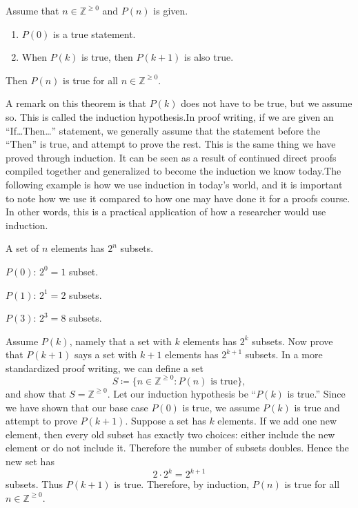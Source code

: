\begin{theorem}{Assume that $n \in \mathbb{Z}^{\geq 0}$ and $P(n)$ is given.
    \begin{enumerate}
        \item $P(0)$ is a true statement.
        \item When $P(k)$ is true, then $P(k+1)$ is also true.
    \end{enumerate}
    Then $P(n)$ is true for all $n \in \mathbb{Z}^{\geq 0}$.
}
A remark on this theorem is that $P(k)$ does not have to be true, but we assume so.
This is called the induction hypothesis.In proof writing, if we are given an ``If\ldots Then\ldots'' statement, we generally assume that the statement before the ``Then'' is true, and attempt to prove the rest.
This is the same thing we have proved through induction.
It can be seen as a result of continued direct proofs compiled together and generalized to become the induction we know today.The following example is how we use induction in today's world, and it is important to note how we use it compared to how one may have done it for a proofs course.
In other words, this is a practical application of how a researcher would use induction.
\end{theorem}

\begin{example}
    A set of $n$ elements has $2^n$ subsets.

    $P(0)$:
    $2^0 = 1$ subset.

    $P(1)$:
    $2^1 = 2$ subsets.

    $P(3)$:
    $2^3 = 8$ subsets.

    Assume $P(k)$, namely that a set with $k$ elements has $2^k$ subsets.
    Now prove that $P(k+1)$ says a set with $k+1$ elements has $2^{k+1}$ subsets.
    In a more standardized proof writing, we can define a set
    \[
        S \coloneqq \{n \in \mathbb{Z}^{\geq 0} : P(n) \text{ is true}\},
    \]
    and show that $S = \mathbb{Z}^{\geq 0}$.
    Let our induction hypothesis be ``$P(k)$ is true.''
    Since we have shown that our base case $P(0)$ is true, we assume $P(k)$ is true and attempt to prove $P(k+1)$.
    Suppose a set has $k$ elements.
    If we add one new element, then every old subset has exactly two choices:
    either include the new element or do not include it.
    Therefore the number of subsets doubles.
    Hence the new set has
    \[
        2 \cdot 2^k = 2^{k+1}
    \]
    subsets.
    Thus $P(k+1)$ is true.
    Therefore, by induction, $P(n)$ is true for all $n \in \mathbb{Z}^{\geq 0}$.
\end{example}